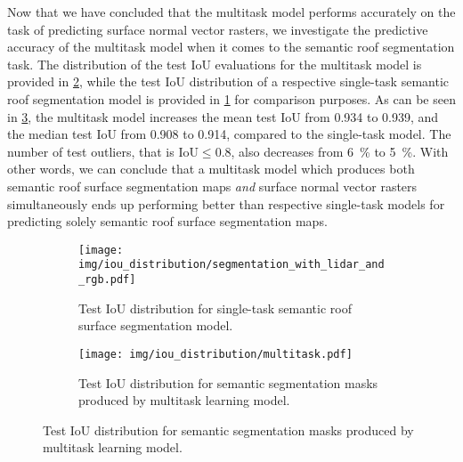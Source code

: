 Now that we have concluded that the multitask model performs accurately on the task of predicting surface normal vector rasters, we investigate the predictive accuracy of the multitask model when it comes to the semantic roof segmentation task.
The distribution of the test IoU evaluations for the multitask model is provided in \cref{fig:multitask-iou-distribution}, while the test IoU distribution of a respective single-task semantic roof segmentation model is provided in \cref{fig:single-task-iou-distribution} for comparison purposes.
As can be seen in \cref{fig:iou-distribution}, the multitask model increases the mean test IoU from \num{0.934} to \num{0.939}, and the median test IoU from \num{0.908} to \num{0.914}, compared to the single-task model.
The number of test outliers, that is $\mathrm{IoU} \leq 0.8$, also decreases from \SI{6}{\percent} to \SI{5}{\percent}.
With other words, we can conclude that a multitask model which produces both semantic roof surface segmentation maps \emph{and} surface normal vector rasters simultaneously ends up performing better than respective single-task models for predicting solely semantic roof surface segmentation maps.
%
\begin{figure}
  \centering
  \begin{subfigure}{\linewidth}
    \centering
    \texttt{[image: img/iou\_distribution/segmentation\_with\_lidar\_and\_rgb.pdf]}
    \caption{%
      Test IoU distribution for single-task semantic roof surface segmentation model.
    }%
    \label{fig:single-task-iou-distribution}
  \end{subfigure}
  \par\bigskip %
  \begin{subfigure}{\linewidth}
    \centering
    \texttt{[image: img/iou\_distribution/multitask.pdf]}
    \caption{%
      Test IoU distribution for semantic segmentation masks produced by multitask learning model.
    }%
    \label{fig:multitask-iou-distribution}
  \end{subfigure}
  \label{fig:iou-distribution}
\end{figure}

